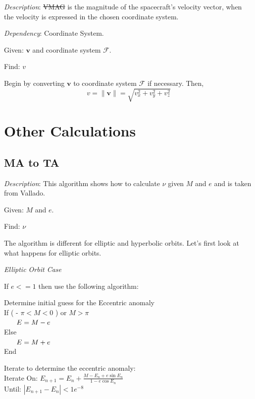\noindent \textit{Description}: \st{VMAG} is the magnitude of the
spacecraft's velocity vector, when the velocity is expressed in the
chosen coordinate system.

\noindent \textit{Dependency}:  Coordinate System.

\noindent Given:  $\mathbf{v}$ and coordinate system $\mathcal{F}$.

\noindent Find:  $v$

Begin by converting $\mathbf{v}$  to coordinate system $\mathcal{F}$
if necessary.  Then,
%
\begin{equation}
    v = \| \mathbf{v} \| = \sqrt{v_x^2 + v_y^2 + v_z^2  }
\end{equation}
%

\section{  Other Calculations }

\subsection{MA to TA}

\noindent \textit{Description}: This algorithm shows how to
calculate $\nu$ given $M$ and $e$ and is taken from
Vallado\cite{vallado2}.

\noindent Given:  $M$ and $e$.

\noindent Find:  $\nu$

The algorithm is different for elliptic and hyperbolic orbits. Let's
first look at what happens for elliptic orbits.

\noindent\textit{Elliptic Orbit Case}

\noindent If  $e <= 1$ then use the following algorithm:

\noindent Determine initial guess for the Eccentric anomaly\\
\noindent If ( - $\pi < M < 0$ ) or $M > \pi$\\
%
$\mbox{}\hspace{ .25 in} E = M - e$ \\
%
Else\\
%
$\mbox{}\hspace{ .25 in} E = M + e$ \\
%
End

\noindent Iterate to determine the eccentric anomaly:\\


 \noindent Iterate On:  $E_{n+1} = E_{n} +
\displaystyle\frac{M - E_n + e\sin{E_n}}{1 -
e\cos{E_n}}$ \\
Until:  $| E_{n+1} - E_n | < 1e^{-8}$

